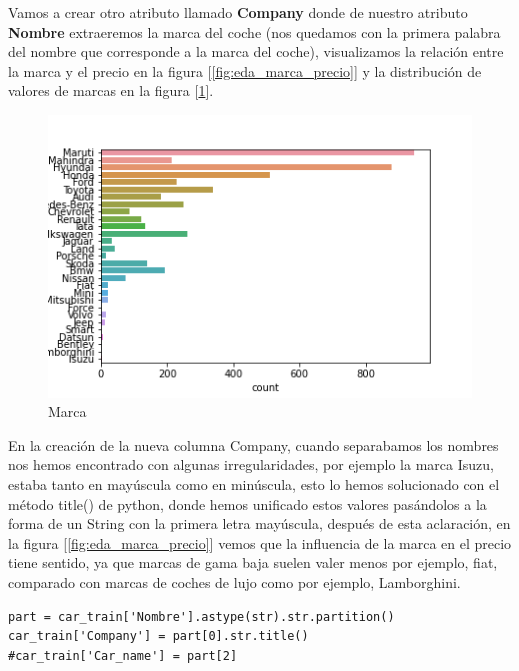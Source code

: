 \documentclass[12pt,twoside]{report}
\begin{document}
Vamos a crear otro atributo llamado \textbf{Company} donde de nuestro atributo \textbf{Nombre} extraeremos la marca del coche (nos quedamos con la primera palabra del nombre que corresponde a la marca del coche), visualizamos la relación entre la marca y el precio en la figura [\ref{fig:eda_marca_precio}] y la distribución de valores de marcas en la figura [\ref{fig:eda_marca}].

\begin{figure}[H]
\includegraphics[width=\textwidth]{../notebooks/figures/company.png}
\caption{Marca}
\label{fig:eda_marca}
\end{figure}

En la creación de la nueva columna Company, cuando separabamos los nombres nos hemos encontrado con algunas irregularidades, por ejemplo la marca Isuzu, estaba tanto en mayúscula como en minúscula, esto lo hemos solucionado con el método title() de python, donde hemos unificado estos valores pasándolos a la forma de un String con la primera letra mayúscula, después de esta aclaración, en la figura [\ref{fig:eda_marca_precio}] vemos que la influencia de la marca en el precio tiene sentido, ya que marcas de gama baja suelen valer menos por ejemplo, fiat, comparado con marcas de coches de lujo como por ejemplo, Lamborghini.

\begin{lstlisting}
part = car_train['Nombre'].astype(str).str.partition()
car_train['Company'] = part[0].str.title()
#car_train['Car_name'] = part[2]
\end{lstlisting}
\end{document}
